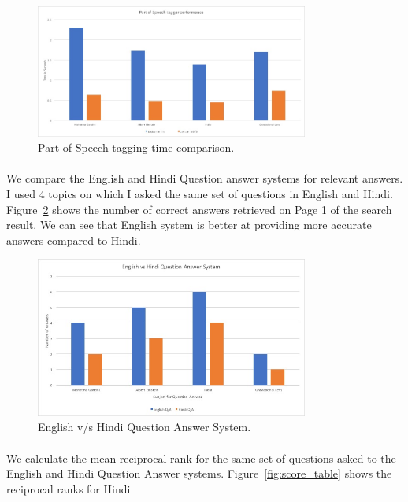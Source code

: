\begin{figure}[htb]
\centering
\includegraphics[width=0.8\textwidth]{images/YioopPoS_performance.jpg}
\caption{Part of Speech tagging time comparison.} 
\label{fig:QA_performance2}
\end{figure}
\break

\paragraph{}
We compare the English and Hindi Question answer systems for relevant answers. I used 4 topics on which I asked the same set of questions in English and Hindi. Figure~\ref{fig:QA_performance3} shows the number of correct answers retrieved on Page 1 of the search result. We can see that English system is better at providing more accurate answers compared to Hindi. 

\begin{figure}[htb]
\centering
\includegraphics[width=0.8\textwidth]{images/QA_performance3.jpg}
\caption{English v/s Hindi Question Answer System.} 
\label{fig:QA_performance3}
\end{figure}

\break
\paragraph{}
We calculate the mean reciprocal rank for the same set of questions asked to the English and Hindi Question Answer systems. Figure~\ref{fig:score_table} shows the reciprocal ranks for Hindi

